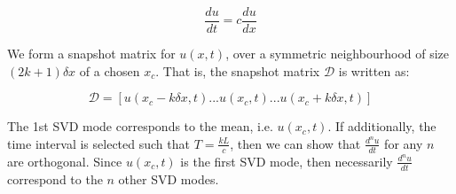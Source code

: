 \documentclass[%
  twocolumn
]{mpi2015-cscpreprint}
\begin{document}
\begin{equation}
    \frac{du}{dt}=c\frac{du}{dx}
\end{equation}

We form a snapshot matrix for $u(x,t)$, over a symmetric neighbourhood of size $(2k+1) \delta x$ of a chosen $x_c$. That is, the snapshot matrix $\mathcal{D}$ is written as:

\begin{equation}
    \mathcal{D}=[u(x_c-k \delta x,t) ... u(x_c,t) ...  u(x_c+k \delta x,t)]
\end{equation}

The 1st SVD mode corresponds to the mean, i.e. $u(x_c,t)$. If additionally, the time interval is selected such that $T=\frac{kL}{c}$, then we can show that $\frac{d^n u}{dt}$ for any $n$ are orthogonal. Since $u(x_c,t)$ is the first SVD mode, then necessarily $\frac{d^n u}{dt}$ correspond to the $n$ other SVD modes.






  
\end{document}
